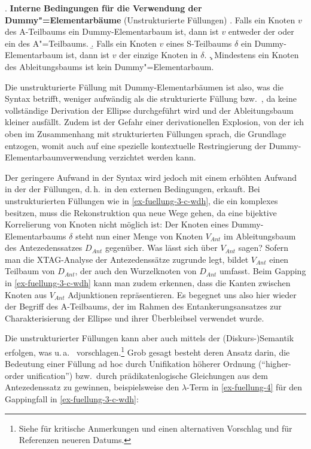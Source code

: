 \ex. {\bf Interne Bedingungen für die Verwendung der Dummy"=Elementarbäume} (Unstrukturierte Füllungen) \label{ex-fuellung-interne-bedingungen-2}
\a. Falls ein Knoten $v$ des A-Teilbaums ein Dummy-Elementarbaum ist, dann ist $v$ entweder der  oder ein  des A"=Teilbaums.
\b. Falls ein Knoten $v$ eines S-Teilbaums $\delta$ ein Dummy-Elementarbaum ist, dann ist $v$ der einzige Knoten in $\delta$.
\c. Mindestens ein Knoten des Ableitungsbaums ist kein Dummy"=Elementarbaum.

Die unstrukturierte Füllung mit Dummy-Elementarbäumen ist also, was die Syntax betrifft, weniger aufwändig als die strukturierte Füllung bzw.\ , da keine vollständige Derivation der Ellipse durchgeführt wird und der Ableitungsbaum kleiner ausfällt. Zudem ist der Gefahr einer derivationellen Explosion, von der ich oben im Zusammenhang mit strukturierten Füllungen sprach, die Grundlage entzogen, womit auch auf eine spezielle kontextuelle Restringierung der Dummy-Elementarbaumverwendung verzichtet werden kann.

Der geringere Aufwand in der Syntax wird jedoch mit einem erhöhten Aufwand in der  der Füllungen, d.\,h.\ in den externen Bedingungen, erkauft. Bei unstrukturierten Füllungen wie in \ref{ex-fuellung-3-c-wdh}, die ein komplexes  besitzen, muss die Rekonstruktion qua  neue Wege gehen, da eine bijektive Korrelierung von Knoten nicht möglich ist: Der Knoten eines Dummy-Elementarbaums $\delta$ steht nun einer Menge von Knoten $V_{Ant}$ im Ableitungsbaum des Antezedenssatzes $D_{Ant}$ gegenüber. Was lässt sich über $V_{Ant}$ sagen? Sofern man die XTAG-Analyse der Antezedenssätze zugrunde legt, bildet $V_{Ant}$ einen Teilbaum von $D_{Ant}$, der auch den Wurzelknoten von $D_{Ant}$ umfasst. Beim Gapping in \ref{ex-fuellung-3-c-wdh} kann man zudem erkennen, dass die Kanten zwischen Knoten aus $V_{Ant}$ Adjunktionen repräsentieren. Es begegnet uns also hier wieder der Begriff des A-Teilbaums, der im Rahmen des Entankerungsansatzes zur Charakterisierung der Ellipse und ihrer Überbleibsel verwendet wurde. 

Die  unstrukturierter Füllungen kann aber auch mittels der (Diskurs-)Seman\-tik erfolgen, was u.\,a.\ \cite{Dalrymple:etal:91}  vorschlagen.\footnote{Siehe \citet[68f]{Hardt:93} für kritische Anmerkungen und einen alternativen Vorschlag und \cite{Winkler:Schwabe:03} für Referenzen neueren Datums.} Grob gesagt besteht deren Ansatz darin, die Bedeutung einer Füllung ad hoc durch Unifikation höherer Ordnung ("`higher-order unification"') bzw.\ durch prädikatenlogische Gleichungen aus dem Antezedenssatz zu gewinnen, beispielsweise den $\lambda$-Term in \ref{ex-fuellung-4} für den Gappingfall in \ref{ex-fuellung-3-c-wdh}:

